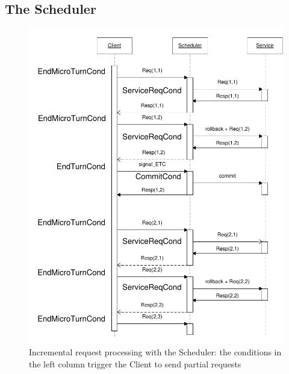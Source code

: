     \subsection{The Scheduler}
    
    	\begin{figure}[htp]
          \centering
          \includegraphics[scale=0.8]{figures/SchedulerDiagEng.pdf}
          \caption{Incremental request processing with the Scheduler: the conditions in the left column trigger the Client to send partial requests}
          \label{fig:schedchrono}
        \end{figure}

